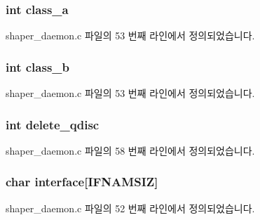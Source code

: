 \subsubsection[{\texorpdfstring{class\+\_\+a}{class_a}}]{\setlength{\rightskip}{0pt plus 5cm}int class\+\_\+a}\hypertarget{structcmd__ip_a6dbf62a77a5eba89b03f961c1674a8e2}{}\label{structcmd__ip_a6dbf62a77a5eba89b03f961c1674a8e2}


shaper\+\_\+daemon.\+c 파일의 53 번째 라인에서 정의되었습니다.

\subsubsection[{\texorpdfstring{class\+\_\+b}{class_b}}]{\setlength{\rightskip}{0pt plus 5cm}int class\+\_\+b}\hypertarget{structcmd__ip_a2f8fc8fa9d90656bc7012b2da063c4f5}{}\label{structcmd__ip_a2f8fc8fa9d90656bc7012b2da063c4f5}


shaper\+\_\+daemon.\+c 파일의 53 번째 라인에서 정의되었습니다.

\subsubsection[{\texorpdfstring{delete\+\_\+qdisc}{delete_qdisc}}]{\setlength{\rightskip}{0pt plus 5cm}int delete\+\_\+qdisc}\hypertarget{structcmd__ip_ac8c5880d70b2a0f4ada79a3d4fedf962}{}\label{structcmd__ip_ac8c5880d70b2a0f4ada79a3d4fedf962}


shaper\+\_\+daemon.\+c 파일의 58 번째 라인에서 정의되었습니다.

\subsubsection[{\texorpdfstring{interface}{interface}}]{\setlength{\rightskip}{0pt plus 5cm}char interface\mbox{[}{\bf I\+F\+N\+A\+M\+S\+IZ}\mbox{]}}\hypertarget{structcmd__ip_adef660e3c86e05938c7534436677f6ee}{}\label{structcmd__ip_adef660e3c86e05938c7534436677f6ee}


shaper\+\_\+daemon.\+c 파일의 52 번째 라인에서 정의되었습니다.


